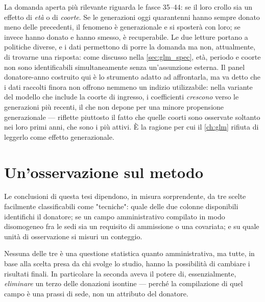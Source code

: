 La domanda aperta più rilevante riguarda le fasce 35--44: se il loro crollo sia
un effetto di \emph{età} o di \emph{coorte}. Se le generazioni oggi
quarantenni hanno sempre donato meno delle precedenti, il fenomeno è
generazionale e si sposterà con loro; se invece hanno donato e hanno smesso, è
recuperabile. Le due letture portano a politiche diverse, e i dati permettono
di porre la domanda ma non, attualmente, di trovarne una risposta: come discusso nella
\cref{sec:glm_spec}, età, periodo e coorte non sono identificabili
simultaneamente senza un'assunzione esterna. Il panel donatore-anno costruito
qui è lo strumento adatto ad affrontarla, ma va detto che i dati raccolti
finora non offrono nemmeno un indizio utilizzabile: nella variante del modello
che include la coorte di ingresso, i coefficienti \emph{crescono} verso le
generazioni più recenti, il che non depone per una minore propensione
generazionale --- riflette piuttosto il fatto che quelle coorti sono osservate
soltanto nei loro primi anni, che sono i più attivi. È la ragione per cui il
\cref{ch:glm} rifiuta di leggerlo come effetto generazionale.

\section*{Un'osservazione sul metodo}

Le conclusioni di questa tesi dipendono, in misura
sorprendente, da tre scelte facilmente classificabili come "tecniche":
quale delle due colonne disponibili identifichi il donatore; se un campo
amministrativo compilato in modo disomogeneo fra le sedi sia un requisito di
ammissione o una covariata; e su quale unità di osservazione si misuri un
conteggio.

Nessuna delle tre è una questione statistica quanto amministrativa,
ma tutte, in base alla scelta presa da chi svolge lo studio, hanno la
possibilità di cambiare i risultati finali. In particolare la seconda
aveva il potere di, essenzialmente, \textit{eliminare} un terzo delle
donazioni isontine --- perché la compilazione di quel campo è una prassi 
di sede, non un attributo del donatore.
